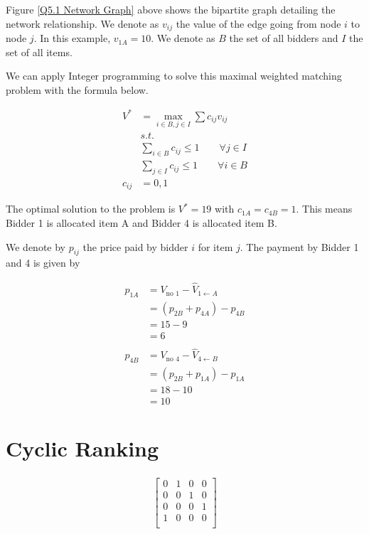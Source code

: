 \documentclass[]{article}
\begin{document}
Figure \ref{Q5.1 Network Graph} above shows the bipartite graph detailing the network relationship. We denote as $v_{ij}$ the value of the edge going from node $i$ to node $j$. In this example, $v_{1A} = 10$. We denote as $B$ the set of all bidders and $I$ the set of all items.

We can apply Integer programming to solve this maximal weighted matching problem with the formula below.

\begin{align*}
	V^* &= \underset{i \in B, j \in I}{\max} \sum c_{ij}v_{ij}\\
	&s.t. \\
	&\sum_{i \in B} c_{ij} \leq 1 \qquad \forall j \in I \\
	&\sum_{j \in I} c_{ij} \leq 1 \qquad \forall i \in B \\
	c_{ij} &= {0, 1}
\end{align*}

The optimal solution to the problem is $V^* = 19$ with $c_{1A} = c_{4B} = 1$. This means Bidder 1 is allocated item A and Bidder 4 is allocated item B.

We denote by $p_{ij}$ the price paid by bidder $i$ for item $j$. The payment by Bidder 1 and 4 is given by

\begin{align*}
	p_{1A} &= V_{\text{no } 1} - \hat{V}_{1 \leftarrow A} \\
		&= (p_{2B} + p_{4A}) - p_{4B} \\
		&= 15 - 9 \\
		&= 6 \\\\
	p_{4B} &= V_{\text{no } 4} - \hat{V}_{4 \leftarrow B} \\
		&= (p_{2B} + p_{1A}) - p_{1A} \\
		&= 18 - 10 \\
		&= 10
\end{align*}


\newpage
\section{Cyclic Ranking}

\begin{gather*}
	\begin{bmatrix}
		0 & 1 & 0 & 0 \\
		0 & 0 & 1 & 0 \\
		0 & 0 & 0 & 1 \\
		1 & 0 & 0 & 0 \\
	\end{bmatrix}
\end{gather*}
\end{document}
